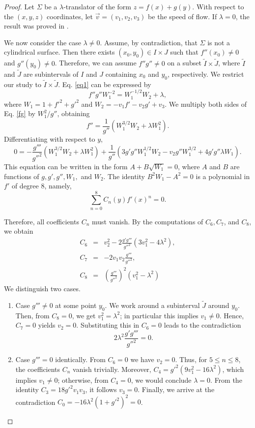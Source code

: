 \documentclass[12pt]{amsart}
\theoremstyle{definition}
\begin{document}
\begin{proof}
Let $\Sigma$ be a $\lambda$-translator of the form $z=f(x)+g(y)$.  With respect to the $(x,y,z)$ coordinates, let   $\vec{v}=(v_1,v_2,v_3)$ be the speed of flow. If $\lambda=0$, the result was proved in \cite[Theorem 5]{al}. 

We now consider the case $\lambda\not=0$. Assume, by contradiction, that $\Sigma$ is not a cylindrical surface. Then there exists $(x_0,y_0)\in I\times J$ such that $f''(x_0)\not=0$ and $g''(y_0)\not=0$. Therefore, we can assume $f''g''\not=0$ on a subset $\tilde{I} \times \tilde{J}$, where $\widetilde{I}$ and $\widetilde{J}$ are subintervals of $I$ and $J$ containing $x_0$ and $y_0$, respectively.  We restrict our study to $\tilde{I} \times \tilde{J}$. Eq. \eqref{eq1} can be expressed by 
\begin{equation}
f''g''W_1^{-2}=W_1^{-1/2}W_2+\lambda, \label{fg}
\end{equation}
where $W_1=1+f'^2+g'^2$ and $W_2=-v_1f'-v_2g'+v_3$. We multiply both sides of Eq. \eqref{fg} by $W_1^2/g''$, obtaining
$$
f''=\frac{1}{g''}(W_1^{3/2}W_2+\lambda W_1^2).
$$
Differentiating with respect to $y$,
\begin{equation}
0=-\frac{g'''}{g''^2}(W_1^{3/2}W_2+\lambda W_1^2)+\frac{1}{g''}(3g'g''W_1^{1/2}W_2-v_2g''W_1^{3/2}+4g'g''\lambda W_1).  \label{fg-1}
\end{equation}
This equation can be written in the form $A+B \sqrt{W_1}=0$, where $A$ and $B$ are functions of $g,g',g'',W_1,$ and $W_2$. The identity $ B^2 W_1-A^2=0$ is a polynomial in $f'$ of degree $8$, namely,  
\begin{equation}\label{final}
\sum_{n=0}^8C_n(y)f'(x)^n=0.
\end{equation}


Therefore, all coefficients $C_n$ must vanish. By the computations of $C_6,C_7$, and $C_8$, we obtain 
\begin{eqnarray*}
C_6&=&v_2^2-2\frac{g'g'''}{g''^2}(3v_1^2-4\lambda^2), \\
C_7&=& -2v_1v_2\frac{g'''}{g''^2}, \\
C_8&=&\left (\frac{g'''}{g''^2} \right)^2(v_1^2-\lambda^2)
\end{eqnarray*}
We distinguish two cases.
 \begin{enumerate}
 \item Case $g'''\not=0$ at some point $y_0$. We work around a subinterval $\widetilde{J}$ around $y_0$. Then, from $C_8=0$, we get $v_1^2=\lambda^2$; in particular this implies $v_1 \neq 0$. Hence, $C_7=0$ yields $v_2=0$. Substituting this in $C_6=0$ leads to the contradiction 
$$2\lambda^2\frac{g'g'''}{g''^2}=0.$$
\item Case $g'''=0$ identically. From $C_6=0$ we have $v_2=0$. Thus, for $5\leq n\leq 8$, the coefficients $C_n$ vanish trivially. Moreover, $C_4=g'^2(9v_1^2-16\lambda^2)$, which implies $v_1 \neq 0$; otherwise, from $C_4=0$, we would conclude $\lambda =0$. From the identity $C_3=18g'^2v_1v_3$, it follows $v_3=0$. Finally, we arrive at the contradiction $C_0=-16\lambda^2(1+g'^2)^2=0$.
 \end{enumerate}
\end{proof}
\end{document}
